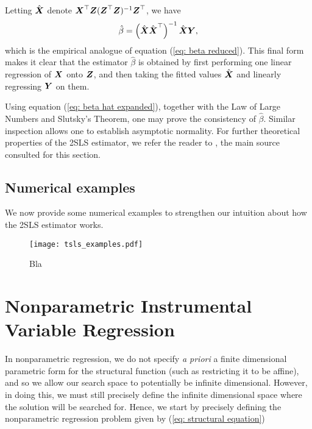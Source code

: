 Letting $ \hat{ \boldsymbol X } $ denote $ \boldsymbol X^{ \top } \boldsymbol Z ( \boldsymbol Z^{ \top } \boldsymbol Z )^{ -1 } \boldsymbol Z^{ \top } $, we have
\begin{equation*}
    \hat{ \beta } = \left( \hat{ \boldsymbol X } \hat{ \boldsymbol X }^{ \top } \right)^{ -1 } \hat{ \boldsymbol X } \boldsymbol Y 
,\end{equation*}
which is the empirical analogue of equation (\ref{eq: beta reduced}).
This final form makes it clear that the estimator $ \hat{ \beta } $ is obtained by first performing one linear regression of $ \boldsymbol X $ onto $ \boldsymbol Z $, and then taking the fitted values $ \hat{ \boldsymbol X } $ and linearly regressing $ \boldsymbol Y $ on them.

Using equation (\ref{eq: beta hat expanded}), together with the Law of Large Numbers and Slutsky's Theorem, one may prove the consistency of $ \hat{ \beta } $.
Similar inspection allows one to establish asymptotic normality.
For further theoretical properties of the 2SLS estimator, we refer the reader to \cite[Chapter~5]{wooldridge2001}, the main source consulted for this section.

\subsection{Numerical examples}

We now provide some numerical examples to strengthen our intuition about how the 2SLS estimator works.
\begin{figure}[htb]
    \begin{center}
        \texttt{[image: tsls\_examples.pdf]}
    \end{center}
    \caption{Bla}
    \label{}
\end{figure}

\section{Nonparametric Instrumental Variable Regression}
\label{sec: nonparametric}

In nonparametric regression, we do not specify \emph{a priori} a finite dimensional parametric form for the structural function (such as restricting it to be affine), and so we allow our search space to potentially be infinite dimensional.
However, in doing this, we must still precisely define the infinite dimensional space where the solution will be searched for.
Hence, we start by precisely defining the nonparametric regression problem given by (\ref{eq: structural equation})

